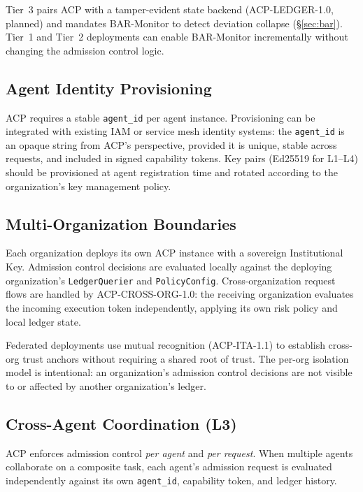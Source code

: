 \documentclass[11pt]{article}
\theoremstyle{definition}
\begin{document}
\noindent Tier~3 pairs ACP with a tamper-evident state backend (ACP-LEDGER-1.0, planned)
and mandates BAR-Monitor to detect deviation collapse (\S\ref{sec:bar}).
Tier~1 and Tier~2 deployments can enable BAR-Monitor incrementally
without changing the admission control logic.

\subsection{Agent Identity Provisioning}

ACP requires a stable \texttt{agent\_id} per agent instance.
Provisioning can be integrated with existing IAM or service mesh identity systems:
the \texttt{agent\_id} is an opaque string from ACP's perspective,
provided it is unique, stable across requests, and included in signed capability tokens.
Key pairs (Ed25519 for L1--L4) should be provisioned at agent registration time
and rotated according to the organization's key management policy.

\subsection{Multi-Organization Boundaries}

Each organization deploys its own ACP instance with a sovereign Institutional Key.
Admission control decisions are evaluated locally against the deploying organization's
\texttt{LedgerQuerier} and \texttt{PolicyConfig}.
Cross-organization request flows are handled by ACP-CROSS-ORG-1.0:
the receiving organization evaluates the incoming execution token independently,
applying its own risk policy and local ledger state.

Federated deployments use mutual recognition (ACP-ITA-1.1) to establish
cross-org trust anchors without requiring a shared root of trust.
The per-org isolation model is intentional: an organization's admission control
decisions are not visible to or affected by another organization's ledger.

\subsection{Cross-Agent Coordination (L3)}

ACP enforces admission control \emph{per agent} and \emph{per request}.
When multiple agents collaborate on a composite task,
each agent's admission request is evaluated independently against its own
\texttt{agent\_id}, capability token, and ledger history.
\end{document}
